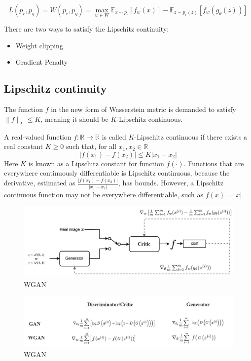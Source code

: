 $$L(p_r, p_g) = W(p_r, p_g) = \max_{w \in W} \mathbb{E}_{x \sim p_r}[f_w(x)] - \mathbb{E}_{z \sim p_r(z)}[f_w(g_\theta(z))]$$

There are two ways to satisfy the Lipschitz continuity:
\begin{itemize}
	\item Weight clipping
	\item Gradient Penalty
\end{itemize}

\subsection{Lipschitz continuity}
The function $f$ in the new form of Wasserstein metric is demanded to satisfy $\| f \|_L \leq K$, meaning it should be $K$-Lipschitz continuous. 

A real-valued function $f: \mathbb{R} \rightarrow \mathbb{R}$ is called $K$-Lipschitz continuous if there exists a real constant $K\geq 0$ such that, for all $x_1, x_2 \in \mathbb{R}$
$$\lvert f(x_1) - f(x_2) \rvert \leq K \lvert x_1 - x_2 \rvert$$
Here $K$ is known as a Lipschitz constant for function $f(\cdot)$. Functions that are everywhere continuously differentiable is Lipschitz continuous, because the derivative, estimated as $\frac{\lvert f(x_1) - f(x_2) \rvert}{\lvert x_1 - x_2 \rvert}$, has bounds. However, a Lipschitz continuous function may not be everywhere differentiable, such as $f(x) = \lvert x \rvert$

\begin{figure}[h]
	\begin{center}
		\includegraphics[scale=0.25]{./images/generative/gan/wgan.jpeg}
	\end{center}
	\caption{WGAN}
	\label{fig:wgan}
\end{figure}

\begin{figure}[h]
	\begin{center}
		\includegraphics[scale=0.2]{./images/generative/gan/wgan_2.jpeg}
	\end{center}
	\caption{WGAN}
\end{figure}
